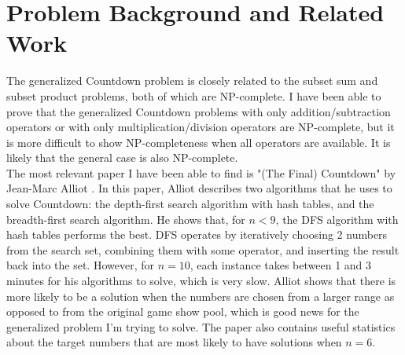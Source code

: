 \documentclass[12pt]{article}
\begin{document}
\section*{Problem Background and Related Work}
The generalized Countdown problem is closely related to the subset sum and subset product problems, both of which are NP-complete. I have been able to prove that the generalized Countdown problems with only addition/subtraction operators or with only multiplication/division operators are NP-complete, but it is more difficult to show NP-completeness when all operators are available. It is likely that the general case is also NP-complete. \\
The most relevant paper I have been able to find is "(The Final) Countdown" by Jean-Marc Alliot \cite{J-M Alliot}. In this paper, Alliot describes two algorithms that he uses to solve Countdown: the depth-first search algorithm with hash tables, and the breadth-first search algorithm. He shows that, for $n < 9$, the DFS algorithm with hash tables performs the best. DFS operates by iteratively choosing 2 numbers from the search set, combining them with some operator, and inserting the result back into the set. However, for $n=10$, each instance takes between 1 and 3 minutes for his algorithms to solve, which is very slow. Alliot shows that there is more likely to be a solution when the numbers are chosen from a larger range as opposed to from the original game show pool, which is good news for the generalized problem I'm trying to solve. The paper also contains useful statistics about the target numbers that are most likely to have solutions when $n=6$. 
\end{document}
